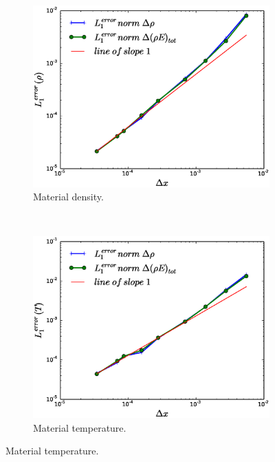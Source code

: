 \documentclass[times,doublespace]{fldauth}%
\begin{document}
\begin{figure}[ht]
    \begin{subfigure}{0.5\textwidth}
    \centering
    \includegraphics[width=\linewidth]{figures/dpt-xs/mass-energy-diff-scd-method-density-convergence.eps}
    \caption{Material density.}\label{fig:mach-3-dpt-xs-density-conv}
    \end{subfigure}
    ~
    \begin{subfigure}{0.5\textwidth}    
    \centering
    \includegraphics[width=\linewidth]{figures/dpt-xs/mass-energy-diff-scd-method-mat-temp-convergence.eps}
    \caption{Material temperature.}\label{fig:mach-3-dpt-xs-temp-conv}
    \end{subfigure}
    

\end{figure}
\end{document}
